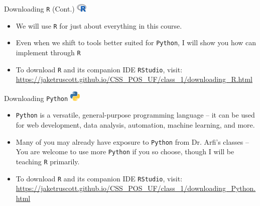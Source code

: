 \documentclass[
  ignorenonframetext,
]{beamer}
\providecommand{\tightlist}{%
  \setlength{\itemsep}{0pt}\setlength{\parskip}{0pt}}
\begin{document}
\begin{frame}{Downloading \texttt{R} (Cont.) \hspace{1.5mm}
\includegraphics[width=5mm]{../../images/R_logo.png}}
\label{downloading-cont.}
\begin{itemize}
\tightlist
\item
  We will use \texttt{R} for just about everything in this course.

  \par \vspace{2.5mm}
\item
  Even when we shift to tools better suited for \texttt{Python}, I will
  show you how can implement through \texttt{R}

  \par \vspace{2.5mm}
\item
  To download \texttt{R} and its companion IDE \texttt{RStudio}, visit:
  \url{https://jaketruscott.github.io/CSS_POS_UF/class_1/downloading_R.html}

  \par \vspace{2.5mm}
\end{itemize}
\end{frame}

\begin{frame}{Downloading \texttt{Python} \hspace{1.5mm}
\includegraphics[width=5mm]{../../images/Python_logo.png}}
\label{downloading-2}
\begin{itemize}
  
  \item \texttt{Python} is a versatile, general-purpose programming language – it can be used for web development, data analysis, automation, machine learning, and more. \par \vspace{2.5mm}
  
  \item Many of you may already have exposure to \texttt{Python} from Dr. Arfi's classes -- You are welcome to use more \texttt{Python} if you so choose, though I will be teaching \texttt{R} primarily.  \par \vspace{2.5mm}
  
  \item To download \texttt{R} and its companion IDE \texttt{RStudio}, visit: \url{https://jaketruscott.github.io/CSS_POS_UF/class_1/downloading_Python.html} \par \vspace{2.5mm}

  
  \end{itemize}
\end{frame}
\end{document}
